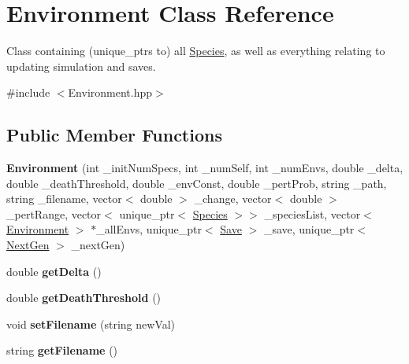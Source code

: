 \hypertarget{classEnvironment}{}\section{Environment Class Reference}
\label{classEnvironment}


Class containing (unique\+\_\+ptrs to) all \hyperlink{classSpecies}{Species}, as well as everything relating to updating simulation and saves.  




{\ttfamily \#include $<$Environment.\+hpp$>$}

\subsection*{Public Member Functions}
\begin{DoxyCompactItemize}
\item 
\mbox{\label{classEnvironment_ac4921c1240e7674ac81860afb5df0272}} 
{\bfseries Environment} (int \+\_\+init\+Num\+Specs, int \+\_\+num\+Self, int \+\_\+num\+Envs, double \+\_\+delta, double \+\_\+death\+Threshold, double \+\_\+env\+Const, double \+\_\+pert\+Prob, string \+\_\+path, string \+\_\+filename, vector$<$ double $>$ \+\_\+change, vector$<$ double $>$ \+\_\+pert\+Range, vector$<$ unique\+\_\+ptr$<$ \hyperlink{classSpecies}{Species} $>$$>$ \+\_\+species\+List, vector$<$ \hyperlink{classEnvironment}{Environment} $>$ $\ast$\+\_\+all\+Envs, unique\+\_\+ptr$<$ \hyperlink{classSave}{Save} $>$ \+\_\+save, unique\+\_\+ptr$<$ \hyperlink{classNextGen}{Next\+Gen} $>$ \+\_\+next\+Gen)
\item 
\mbox{\label{classEnvironment_a58c5fa5e6b682d47fd22f1475410266d}} 
double {\bfseries get\+Delta} ()
\item 
\mbox{\label{classEnvironment_a14802408594d924c478c7a102706a32e}} 
double {\bfseries get\+Death\+Threshold} ()
\item 
\mbox{\label{classEnvironment_a0451300ebededfab5643fbfc8b3fa114}} 
void {\bfseries set\+Filename} (string new\+Val)
\item 
\mbox{\label{classEnvironment_abedd295a12a1e2f3c1b5823ca03018c8}} 
string {\bfseries get\+Filename} ()
\item 
$$
\end{DoxyCompactItemize}
